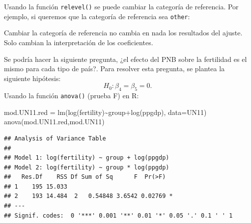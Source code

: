 \documentclass[
]{article}
\newenvironment{Shaded}{\begin{snugshade}}{\end{snugshade}}
\newcommand{\AttributeTok}[1]{\textcolor[rgb]{0.77,0.63,0.00}{#1}}
\newcommand{\FunctionTok}[1]{\textcolor[rgb]{0.00,0.00,0.00}{#1}}
\newcommand{\NormalTok}[1]{#1}
\newcommand{\OtherTok}[1]{\textcolor[rgb]{0.56,0.35,0.01}{#1}}
\newcommand{\SpecialCharTok}[1]{\textcolor[rgb]{0.00,0.00,0.00}{#1}}
\newcommand{\StringTok}[1]{\textcolor[rgb]{0.31,0.60,0.02}{#1}}
\begin{document}
Usando la función \texttt{relevel()} se puede cambiar la categoría de referencia. Por ejemplo, si queremos que la categoría de referencia sea \texttt{other}:

\begin{Shaded}
\end{Shaded}

Cambiar la categoría de referencia no cambia en nada los resultados del ajuste. Solo cambian la interpretación de los coeficientes.

Se podría hacer la siguiente pregunta, ¿el efecto del PNB sobre la fertilidad es el mismo para cada tipo de país?. Para resolver esta pregunta, se plantea la siguiente hipótesis:
\[
H_0: \beta_4 = \beta_5 = 0.
\]
Usando la función \texttt{anova()} (prueba F) en R:

\begin{Shaded}
\begin{Highlighting}[]
\NormalTok{mod.UN11.red }\OtherTok{=} \FunctionTok{lm}\NormalTok{(}\FunctionTok{log}\NormalTok{(fertility)}\SpecialCharTok{\textasciitilde{}}\NormalTok{group}\SpecialCharTok{+}\FunctionTok{log}\NormalTok{(ppgdp), }\AttributeTok{data=}\NormalTok{UN11)}
\FunctionTok{anova}\NormalTok{(mod.UN11.red,mod.UN11)}
\end{Highlighting}
\end{Shaded}

\begin{verbatim}
## Analysis of Variance Table
## 
## Model 1: log(fertility) ~ group + log(ppgdp)
## Model 2: log(fertility) ~ group * log(ppgdp)
##   Res.Df    RSS Df Sum of Sq      F  Pr(>F)  
## 1    195 15.033                              
## 2    193 14.484  2   0.54848 3.6542 0.02769 *
## ---
## Signif. codes:  0 '***' 0.001 '**' 0.01 '*' 0.05 '.' 0.1 ' ' 1
\end{verbatim}
\end{document}
